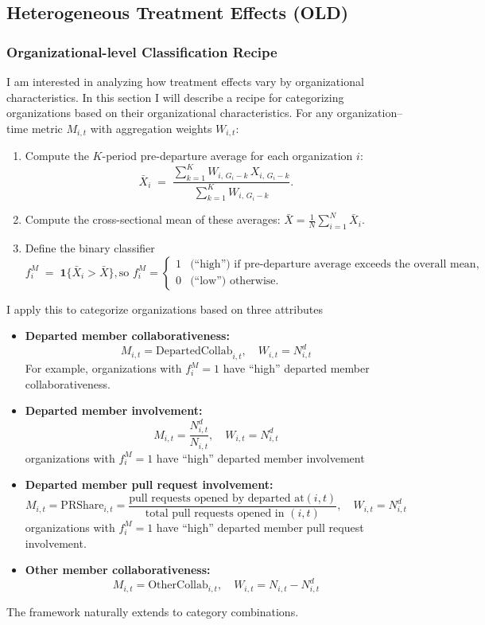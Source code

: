 \documentclass[12pt,notitlepage]{article}
\begin{document}
\subsection{Heterogeneous Treatment Effects (OLD)}
\subsubsection{Organizational-level Classification Recipe}\label{sec:org_level_subset}
I am interested in analyzing how treatment effects vary by organizational characteristics. In this section I will describe a recipe for categorizing organizations based on their organizational characteristics. For any organization–time metric \(M_{i,t}\) with aggregation weights \(W_{i,t}\):
\begin{enumerate}
\item Compute the \(K\)-period pre-departure average for each organization \(i\):
 \[
 \bar X_i
 \;=\;
 \frac{\sum_{k=1}^{K} W_{i,\,G_i-k}\,X_{i,\,G_i-k}}
{\sum_{k=1}^{K} W_{i,\,G_i-k}}.
 \]
\item Compute the cross-sectional mean of these averages: 
 $\bar X = \frac{1}{N}\sum_{i=1}^N \bar X_i.$
\item Define the binary classifier
 \[
 f_i^M \;=\; \mathbf{1}\{\bar X_i > \bar X\},
 \text{so }
 f_i^M = 
 \begin{cases}
 1 & \text{(``high'') if pre‐departure average exceeds the overall mean},\\
 0 & \text{(``low'') otherwise}.
 \end{cases}
 \]
\end{enumerate}
\medskip
I apply this to categorize organizations based on three attributes
\begin{itemize}
\setlength\itemsep{0.5em}
\item \textbf{Departed member collaborativeness:}
\[
M_{i,t} = \mathrm{DepartedCollab}_{i,t},\quad
W_{i,t} = N^d_{i,t}
\]
For example, organizations with \(f_i^M=1\) have ``high'' departed member collaborativeness.
\item \textbf{Departed member involvement:}
\[
M_{i,t} = \frac{N^d_{i,t}}{N_{i,t}},\quad
W_{i,t} = N^d_{i,t}
\]
organizations with \(f_i^M=1\) have ``high'' departed member involvement
\item \textbf{Departed member pull request involvement:}
\[
M_{i,t} = \mathrm{PRShare}_{i,t}
= \frac{\text{pull requests opened by departed at}(i,t)}{\text{total pull requests opened in }(i,t)},
\quad
W_{i,t} = N^d_{i,t}
\]
organizations with \(f_i^M=1\) have ``high'' departed member pull request involvement.
\setlength\itemsep{0.5em}
\item \textbf{Other member collaborativeness:}
\[
M_{i,t} = \mathrm{OtherCollab}_{i,t},\quad
W_{i,t} = N_{i, t} - N^d_{i,t}
\]
\end{itemize}
The framework naturally extends to category combinations. 
\end{document}
